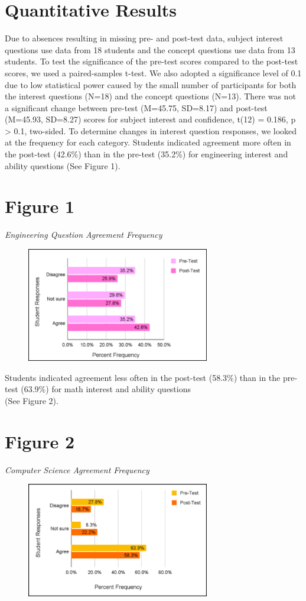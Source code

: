 \documentclass[11.5pt]{sig-alternate}
\begin{document}
\begin{large}
\section*{ Quantitative Results}

Due to absences resulting in missing pre- and post-test data, subject interest questions use data from 18 students and the concept questions use data from 13 students. To test the significance of the pre-test scores compared to the post-test scores, we used a paired-samples t-test. We also adopted a significance level of 0.1 due to low statistical power caused by the small number of participants for both the interest questions (N=18) and the concept questions (N=13). There was not a significant change between pre-test (M=45.75, SD=8.17) and post-test (M=45.93, SD=8.27) scores for subject interest and confidence, t(12) = 0.186, p > 0.1, two-sided. To determine changes in interest question responses, we looked at the frequency for each category. Students indicated agreement more often in the post-test (42.6\%) than in the pre-test (35.2\%) for engineering interest and ability questions (See Figure 1).
\section*{Figure 1}
\textit{Engineering Question Agreement Frequency}
\begin{figure}[h!]
\centering
\includegraphics[width=8cm]{figure 1.png}
\end{figure}

Students indicated agreement less often in the post-test (58.3\%) than in the pre-test (63.9\%) for math interest and ability questions \\(See Figure 2). 
\section*{Figure 2}
\textit{Computer Science Agreement Frequency}
\\
\begin{figure}[h!]
\centering
\includegraphics[width=8cm]{figure 2.png}
\end{figure}


\end{large}
\end{document}
